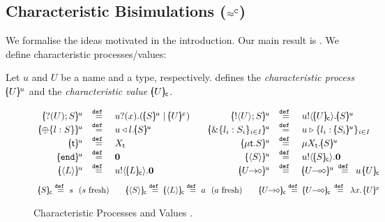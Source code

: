 \subsection{%
Characteristic  Bisimulations ($\approx^\mathtt{C}$)}\label{ss:hwb}
\noi 
We formalise the ideas motivated in %
the introduction.
Our main result is .
We define characteristic processes/values:

\begin{definition}\rm
\label{def:char}
	Let $u$ and $U$ be a name and a type, respectively.
	 defines the {\em characteristic process} 
	$[\!\!(U)\!\!]^{u}$ and the {\em characteristic value} $[\!\!(U)\!\!]_{\mathsf{c}}$.
\end{definition}

\begin{figure}[t]
\[
	\begin{array}{rclcrcl}
		\mapchar{\btinp{U} S}{u}
		&\defeq&
		\binp{u}{x} (\mapchar{S}{u} \Par \mapchar{U}{x})
		&&
		\mapchar{\btout{U} S}{u}
		&\defeq&
		\bout{u}{\omapchar{U}} \mapchar{S}{u} %
		\\

		\mapchar{\btsel{l : S}}{u}
		& \defeq &
		\bsel{u}{l} \mapchar{S}{u}
		&&
		\mapchar{\btbra{l_i: S_i}_{i \in I}}{u}
		& \defeq &
		\bbra{u}{l_i: \mapchar{S_i}{u}}_{i \in I}
		\\

		\mapchar{\tvar{t}}{u}
		&\defeq&
		\varp{X}_{\vart{t}}
		& & 
		\mapchar{\trec{t}{S}}{u}
		&\defeq&
		\recp{X_{\vart{t}}}{\mapchar{S}{u}}
		\\

		\mapchar{\tinact}{u}
		& \defeq &
		\inact
		& & 
		\mapchar{\chtype{S}}{u} 
		&\defeq&
		\bout{u}{\omapchar{S}} \inact
		\\

		\mapchar{\chtype{L}}{u}
		&\defeq&
		\bout{u}{\omapchar{L}} \inact
		&&
		\mapchar{\shot{U}}{u}
		&\defeq &
		\mapchar{\lhot{U}}{u}
		\, \defeq \,
		\appl{u}{\omapchar{U}}
		\end{array}
		\]
		\vspace{-3mm}
		\[
		\begin{array}{c}
		\omapchar{S}  \defeq  s ~~ (s \textrm{ fresh})
		\qquad
		\omapchar{\chtype{S}} \defeq \omapchar{\chtype{L}} \defeq a ~~ (a \textrm{ fresh})
		\qquad
		\omapchar{\shot{U}} \defeq \omapchar{\lhot{U}} \,\defeq\, \abs{x}{\mapchar{U}{x}}
	\end{array}
\]
\vspace{-5mm}
\caption{Characteristic Processes  and Values .\label{fig:char}}
\end{figure}

